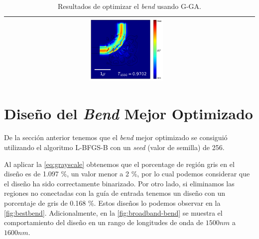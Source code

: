 \begin{table}[ht]
\begin{tabular}{|c|c|c|c|}
      \cline{2-4}
      &
      \includegraphics[width=0.33\textwidth]{image/results/bend/GA/visualize_field_cont_512.png} \\
    \hline
    \end{tabular}
    \hspace*{-3cm}
    \caption{Resultados de optimizar el \emph{bend} usando G-GA.}
    \label{tab:opt-GA-bend}
\end{table}


\section{Diseño del \emph{Bend} Mejor Optimizado}\label{sec:best-bend}

De la sección anterior tenemos que el \emph{bend} mejor optimizado se consiguió
utilizando el algoritmo L-BFGS-B con un \emph{seed} (valor de semilla) de 256.

Al aplicar la \autoref{eq:grayscale} obtenemos que el porcentage de región gris en el diseño
es de 1.097 \%, un valor menor a 2 \%, por lo cual podemos considerar que el diseño ha sido
correctamente binarizado. Por otro lado, si eliminamos las regiones no conectadas con la guía de entrada
tenemos un diseño con un porcentaje de gris de 0.168 \%.
Estos diseños lo podemos observar en la \autoref{fig:bestbend}.
Adicionalmente, en la \autoref{fig:broadband-bend} se muestra el comportamiento del diseño
en un rango de longitudes de onda de $1500nm$ a $1600 nm$.

